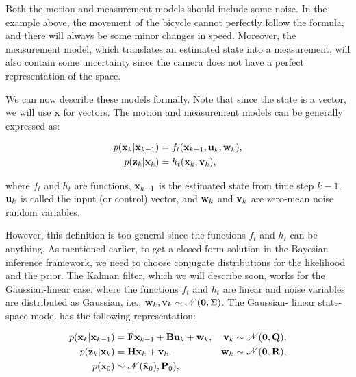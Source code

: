 Both the motion and measurement models should include some noise. In the 
example above, the movement of the bicycle cannot perfectly follow the formula, 
and there will always be some minor changes in speed. Moreover, the measurement 
model, which translates an estimated state into a measurement, will also 
contain some uncertainty since the camera does not have a perfect 
representation of the space.

We can now describe these models formally. Note that since the state is a 
vector, we will use $\mathbf{x}$ for vectors. The motion and measurement models 
can be generally expressed as:

\begin{align}
    p(\vecat{x}{k} | \vecat{x}{k-1}) 
        &= f_t(\vecat{x}{k-1}, \vecat{u}{k}, \vecat{w}{k}), \\
    p(\vecat{z}{k} | \vecat{x}{k}) 
        &= h_t(\vecat{x}{k}, \vecat{v}{k}),
\end{align}

\noindent where $f_t$ and $h_t$ are functions, $\vecat{x}{k-1}$ is the estimated state 
from time step $k-1$, $\vecat{u}{k}$ is called the input (or control) vector, 
and $\vecat{w}{k}$ and $\vecat{v}{k}$ are zero-mean noise random variables.

However, this definition is too general since the functions $f_t$ and $h_t$ can 
be anything. As mentioned earlier, to get a closed-form solution in the 
Bayesian inference framework, we need to choose conjugate distributions for the 
likelihood and the prior. The Kalman filter, which we will describe soon, works 
for the Gaussian-linear case, where the functions $f_t$ and $h_t$ are linear 
and noise variables are distributed as Gaussian, i.e., 
$\vecat{w}{k}, \vecat{v}{k} \sim \mathscr{N}(\mathbf{0}, \Sigma)$. The Gaussian-
linear state-space model has the following representation:

\begin{align}
    p(\vecat{x}{k} | \vecat{x}{k-1}) 
        &= \mathbf{F} \vecat{x}{k-1}
            + \mathbf{B} \vecat{u}{k}
            + \vecat{w}{k},
        & \vecat{v}{k} \sim \mathscr{N}(\mathbf{0}, \mathbf{Q}), \\
    p(\vecat{z}{k} | \vecat{x}{k})
        &= \mathbf{H} \vecat{x}{k} + \vecat{v}{k},
        & \vecat{w}{k} \sim \mathscr{N}(\mathbf{0}, \mathbf{R}), \\
    p(\vecat{x}{0}) &\sim \mathscr{N}(\vecat{\hat{x}}{0}), \vecat{P}{0}),&
\end{align}

